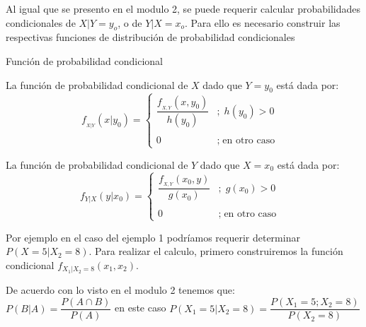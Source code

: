 \documentclass[base=hide,12pt]{elegantbook}
\begin{document}
Al igual que se presento en el modulo 2, se puede requerir calcular probabilidades condicionales de $X|Y=y_{o}$, o de $Y|X=x_{o}$. Para ello es necesario construir las respectivas funciones de distribución de probabilidad condicionales

\vspace{1cm}
\begin{Box4}{Función de probabilidad condicional}
	
La función de probabilidad condicional de $X$ dado que $Y=y_0$ está dada por:
\begin{equation*}
	f_{_{X|Y}}(x|y_{0})=\left\{
	\begin{array}{ccl}
		\dfrac{f_{_{X,Y}}(x,y_0)}{h(y_{0})}&;\;h(y_{0})>0&\\
		&&\\
		0&;\;\mbox{en otro caso}&
	\end{array}
	\right.
\end{equation*}

La función de probabilidad condicional de $Y$ dado que $X=x_0$ está dada por:
\begin{equation*}
	f_{Y|X}(y|x_{0})=\left\{
	\begin{array}{ccl}
		\dfrac{f_{_{X,Y}}(x_0,y)}{g(x_0)}&;\;g(x_0)>0&\\
		&&\\
		0&;\;\mbox{en otro caso}&
	\end{array}
	\right.
\end{equation*}
\end{Box4}

	
Por ejemplo en el caso del ejemplo 1 podríamos requerir determinar $P(X=5|X_{2}=8)$. Para realizar el calculo, primero construiremos la función condicional $f_{X_{1}|X_{2}=8}(x_{1},x_{2})$.

De acuerdo con lo visto en el modulo 2 tenemos que:\\

$P(B|A)=\dfrac{P(A \cap B)}{P(A)} $ en este caso $P(X_{1}=5|X_{2}=8) = \dfrac{P(X_{1}=5;X_{2}=8)}{P(X_{2}=8)}$
\end{document}
